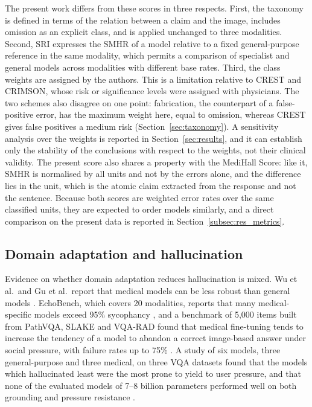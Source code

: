 \documentclass[11pt,a4paper]{article}
\newcommand{\SMHR}{\ensuremath{\mathrm{SMHR}}}
\newcommand{\SRI}{\ensuremath{\mathrm{SRI}}}
\begin{document}
The present work differs from these scores in three respects. First, the taxonomy is defined in terms of the relation between a claim and the image, includes omission as an explicit class, and is applied unchanged to three modalities. Second, \SRI{} expresses the \SMHR{} of a model relative to a fixed general-purpose reference in the same modality, which permits a comparison of specialist and general models across modalities with different base rates. Third, the class weights are assigned by the authors. This is a limitation relative to CREST and CRIMSON, whose risk or significance levels were assigned with physicians. The two schemes also disagree on one point: fabrication, the counterpart of a false-positive error, has the maximum weight here, equal to omission, whereas CREST gives false positives a medium risk (Section~\ref{sec:taxonomy}). A sensitivity analysis over the weights is reported in Section~\ref{sec:results}, and it can establish only the stability of the conclusions with respect to the weights, not their clinical validity. The present score also shares a property with the MediHall Score: like it, \SMHR{} is normalised by all units and not by the errors alone, and the difference lies in the unit, which is the atomic claim extracted from the response and not the sentence. Because both scores are weighted error rates over the same classified units, they are expected to order models similarly, and a direct comparison on the present data is reported in Section~\ref{subsec:res_metrics}.

\subsection{Domain adaptation and hallucination}
\label{subsec:rw_special}

Evidence on whether domain adaptation reduces hallucination is mixed. Wu et al.\ and Gu et al.\ report that medical models can be less robust than general models \citep{wu2024halluvqa,gu2024medvh}. EchoBench, which covers 20 modalities, reports that many medical-specific models exceed 95\% sycophancy \citep{yuan2025echobench}, and a benchmark of 5,000 items built from PathVQA, SLAKE and VQA-RAD found that medical fine-tuning tends to increase the tendency of a model to abandon a correct image-based answer under social pressure, with failure rates up to 75\% \citep{xu2025sycophancy}. A study of six models, three general-purpose and three medical, on three VQA datasets found that the models which hallucinated least were the most prone to yield to user pressure, and that none of the evaluated models of 7--8 billion parameters performed well on both grounding and pressure resistance \citep{aranya2026grounding}.
\end{document}
